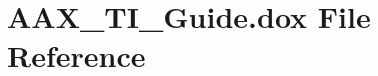 \hypertarget{a00389}{}\section{A\+A\+X\+\_\+\+T\+I\+\_\+\+Guide.\+dox File Reference}
\label{a00389}

